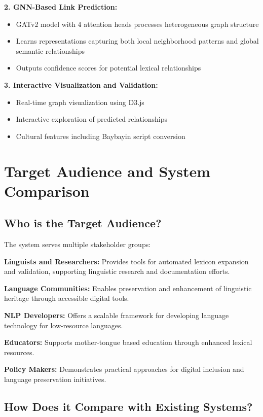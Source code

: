 \documentclass[11pt]{article}
\begin{document}
\textbf{2. GNN-Based Link Prediction:}
\begin{itemize}
    \item GATv2 model with 4 attention heads processes heterogeneous graph structure
    \item Learns representations capturing both local neighborhood patterns and global semantic relationships
    \item Outputs confidence scores for potential lexical relationships
\end{itemize}

\textbf{3. Interactive Visualization and Validation:}
\begin{itemize}
    \item Real-time graph visualization using D3.js
    \item Interactive exploration of predicted relationships
    \item Cultural features including Baybayin script conversion
\end{itemize}

\section{Target Audience and System Comparison}

\subsection{Who is the Target Audience?}

The system serves multiple stakeholder groups:

\textbf{Linguists and Researchers:} Provides tools for automated lexicon expansion and validation, supporting linguistic research and documentation efforts.

\textbf{Language Communities:} Enables preservation and enhancement of linguistic heritage through accessible digital tools.

\textbf{NLP Developers:} Offers a scalable framework for developing language technology for low-resource languages.

\textbf{Educators:} Supports mother-tongue based education through enhanced lexical resources.

\textbf{Policy Makers:} Demonstrates practical approaches for digital inclusion and language preservation initiatives.

\subsection{How Does it Compare with Existing Systems?}
\end{document}
